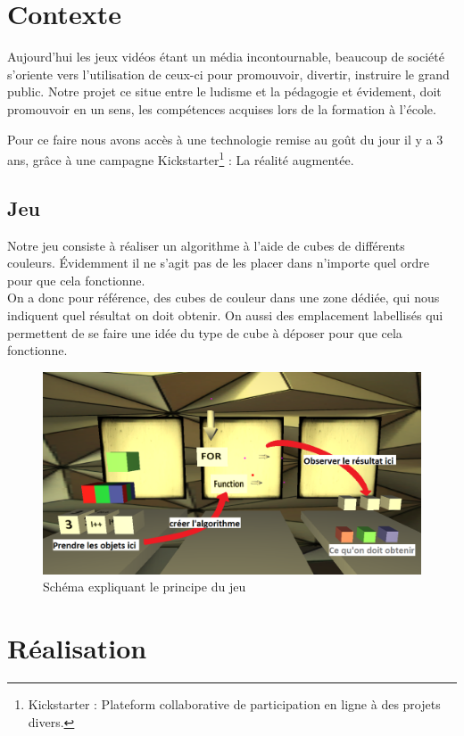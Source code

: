 \documentclass[a4paper,11pt]{myreport}
\begin{document}
\chapter{Contexte}
\par Aujourd'hui les jeux vidéos étant un média incontournable, beaucoup de société s'oriente vers l'utilisation de ceux-ci pour promouvoir, divertir, instruire le grand public. Notre projet ce situe entre le ludisme et la pédagogie et évidement, doit promouvoir en un sens, les compétences acquises lors de la formation à l'école.
\par Pour ce faire nous avons accès à une technologie remise au goût du jour il y a 3 ans, grâce à une campagne Kickstarter\footnote{Kickstarter : Plateform collaborative de participation en ligne à des projets divers.} : La réalité augmentée.

\section{Jeu}
\par Notre jeu consiste à réaliser un algorithme à l'aide de cubes de différents couleurs. Évidemment il ne s'agit pas de les placer dans n'importe quel ordre pour que cela fonctionne.\\
On a donc pour référence, des cubes de couleur dans une zone dédiée, qui nous indiquent quel résultat on doit obtenir. On aussi des emplacement labellisés qui permettent de se faire une idée du type de cube à déposer pour que cela fonctionne. 
\begin{figure}[h]
	\includegraphics[scale=0.50]{./images/jeu.png}
	\caption{Schéma expliquant le principe du jeu}
	\end{figure}

\chapter{Réalisation}
\end{document}

